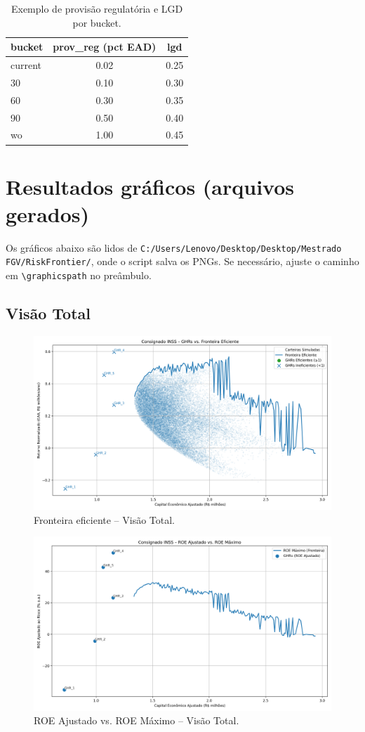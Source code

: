 \documentclass[11pt,a4paper]{article}
\newcommand{\1}{\mathbf{1}}
\begin{document}
\begin{table}[H]\centering
\small
\begin{tabular}{lcc}
\toprule
bucket & prov\_reg (pct EAD) & lgd \\
\midrule
current & 0.02 & 0.25 \\
30      & 0.10 & 0.30 \\
60      & 0.30 & 0.35 \\
90      & 0.50 & 0.40 \\
wo      & 1.00 & 0.45 \\
\bottomrule
\end{tabular}
\caption{Exemplo de provisão regulatória e LGD por bucket.}
\end{table}

\section{Resultados gráficos (arquivos gerados)}
\label{sec:resultados}
Os gráficos abaixo são lidos de \texttt{C:/Users/Lenovo/Desktop/Desktop/Mestrado FGV/RiskFrontier/}, onde o script salva os PNGs. Se necessário, ajuste o caminho em \verb|\graphicspath| no preâmbulo.

\subsection*{Visão Total}
\begin{figure}[H]\centering
\includegraphics[width=.85\linewidth]{fronteira.png}
\caption{Fronteira eficiente – Visão Total.}
\end{figure}

\begin{figure}[H]\centering
\includegraphics[width=.85\linewidth]{roe_maximo.png}
\caption{ROE Ajustado vs. ROE Máximo – Visão Total.}
\end{figure}
\end{document}
